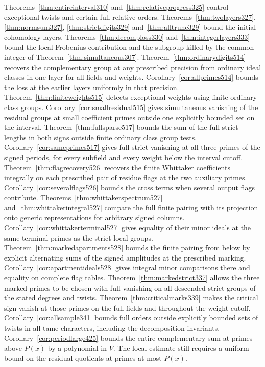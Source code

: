 \documentclass[a4paper,11pt]{article}
\theoremstyle{definition}
\theoremstyle{remark}
\numberwithin{equation}{section}
\begin{document}
Theorems~\ref{thm:entireinterval310} and~\ref{thm:relativeprogress325} control exceptional twists and certain full relative orders. Theorems~\ref{thm:twolayers327}, \ref{thm:normsum327}, \ref{thm:strictdigits329} and~\ref{thm:alltrunc329} bound the initial cohomology layers. Theorems~\ref{thm:decomploss330} and~\ref{thm:integerlayers333} bound the local Frobenius contribution and the subgroup killed by the common integer of Theorem~\ref{thm:simultaneous307}. Theorem~\ref{thm:ordinarydigits514} recovers the complementary group at any prescribed precision from ordinary ideal classes in one layer for all fields and weights. Corollary~\ref{cor:allprimes514} bounds the loss at the earlier layers uniformly in that precision. Theorem~\ref{thm:finiteweights515} detects exceptional weights using finite ordinary class groups. Corollary~\ref{cor:smallresidual515} gives simultaneous vanishing of the residual groups at small coefficient primes outside one explicitly bounded set on the interval. Theorem~\ref{thm:fullsparse517} bounds the sum of the full strict lengths in both signs outside finite ordinary class group tests. Corollary~\ref{cor:sameprimes517} gives full strict vanishing at all three primes of the signed periods, for every subfield and every weight below the interval cutoff. Theorem~\ref{thm:flagrecovery526} recovers the finite Whittaker coefficients integrally on each prescribed pair of residue flags at the two auxiliary primes. Corollary~\ref{cor:severalflags526} bounds the cross terms when several output flags contribute. Theorems~\ref{thm:whittakerspectrum527} and~\ref{thm:whittakerintegral527} compare the full finite pairing with its projection onto generic representations for arbitrary signed columns. Corollary~\ref{cor:whittakerterminal527} gives equality of their minor ideals at the same terminal primes as the strict local groups. Theorem~\ref{thm:markedapartments528} bounds the finite pairing from below by explicit alternating sums of the signed amplitudes at the prescribed marking. Corollary~\ref{cor:apartmentideals528} gives integral minor comparisons there and equality on complete flag tables. Theorem~\ref{thm:markedstrict337} allows the three marked primes to be chosen with full vanishing on all descended strict groups of the stated degrees and twists. Theorem~\ref{thm:criticalmarks339} makes the critical sign vanish at those primes on the full fields and throughout the weight cutoff. Corollary~\ref{cor:allsample341} bounds full orders outside explicitly bounded sets of twists in all tame characters, including the decomposition invariants. Corollary~\ref{cor:periodlarge425} bounds the entire complementary sum at primes above \(P(x)\) by a polynomial in \(V\). The local estimate still requires a uniform bound on the residual quotients at primes at most \(P(x)\).
\end{document}
